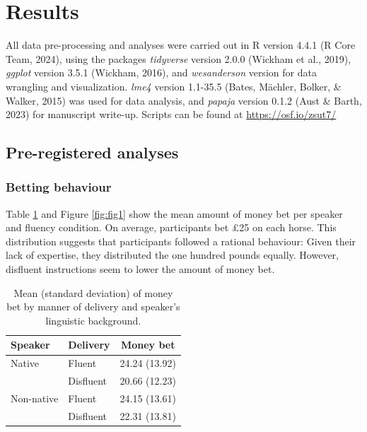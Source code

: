 \documentclass[
  man,floatsintext]{apa7}
\begin{document}
\hypertarget{results}{%
\section{Results}\label{results}}

All data pre-processing and analyses were carried out in R version 4.4.1 (R Core Team, 2024), using the packages \emph{tidyverse} version 2.0.0 (Wickham et al., 2019), \emph{ggplot} version 3.5.1 (Wickham, 2016), and \emph{wesanderson} version for data wrangling and visualization. \emph{lme4} version 1.1-35.5 (Bates, Mächler, Bolker, \& Walker, 2015) was used for data analysis, and \emph{papaja} version 0.1.2 (Aust \& Barth, 2023) for manuscript write-up. Scripts can be found at \url{https://osf.io/zsut7/}

\hypertarget{pre-registered-analyses}{%
\subsection{Pre-registered analyses}\label{pre-registered-analyses}}

\hypertarget{betting-behaviour}{%
\subsubsection{Betting behaviour}\label{betting-behaviour}}

Table \ref{tab:tab-dist-money} and Figure \ref{fig:fig1} show the mean amount of money bet per speaker and fluency condition. On average, participants bet £25 on each horse. This distribution suggests that participants followed a rational behaviour: Given their lack of expertise, they distributed the one hundred pounds equally. However, disfluent instructions seem to lower the amount of money bet.

\begin{table}[tbp]

\begin{center}
\begin{threeparttable}

\caption{\label{tab:tab-dist-money}Mean (standard deviation) of money bet by manner of delivery and speaker’s linguistic
background.}

\begin{tabular}{lll}
\toprule
Speaker & \multicolumn{1}{c}{Delivery} & \multicolumn{1}{c}{Money bet}\\
\midrule
Native & Fluent & 24.24 (13.92)\\
 & Disfluent & 20.66 (12.23)\\
Non-native & Fluent & 24.15 (13.61)\\
 & Disfluent & 22.31 (13.81)\\
\bottomrule
\end{tabular}

\end{threeparttable}
\end{center}

\end{table}
\end{document}
